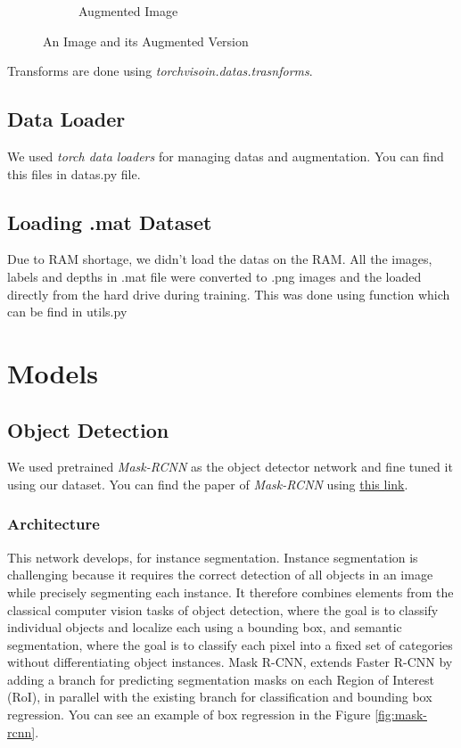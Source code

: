 \documentclass[a4paper, openany]{book}
\begin{document}
\begin{figure}[ht]
\begin{subfigure}[b]{0.3\linewidth}
    \caption{Augmented Image}
  \end{subfigure}
  \caption{An Image and its Augmented Version}
  \label{fig:augment}
\end{figure}

Transforms are done using \textit{torchvisoin.datas.trasnforms}.
\subsection{Data Loader}
	\vspace{0.3cm}
We used \textit{torch data loaders} for managing datas and augmentation. You can find this files in datas.py file.

\subsection{Loading .mat Dataset}
	\vspace{0.3cm}

Due to RAM shortage, we didn't load the datas on the RAM. All the images, labels and depths in .mat file were converted to .png images and the loaded directly from the hard drive during training. This was done using function  which can be find in utils.py


\newpage

	
\section{Models}
	\vspace{0.3cm}
\subsection{Object Detection}
	\vspace{0.3cm}

We used pretrained \textit{Mask-RCNN} as the object detector network and fine tuned it using our dataset. You can find the paper of \textit{Mask-RCNN} using \href{https://arxiv.org/pdf/1703.06870.pdf}{this link}.

\subsubsection{Architecture}

This network develops, for instance segmentation. Instance segmentation is challenging because it requires the correct detection of all objects in an image while precisely segmenting each instance. It therefore combines elements from the classical computer vision tasks of object detection, where the goal is to classify individual objects and localize each using a bounding box, and semantic segmentation, where the goal is to classify each pixel into a fixed set of categories without differentiating object instances.
Mask R-CNN, extends Faster R-CNN by adding a branch for predicting segmentation masks on each Region of Interest (RoI), in parallel with the existing branch for classification and bounding box regression. You can see an example of box regression in the Figure \ref{fig:mask-rcnn}.
\end{document}
